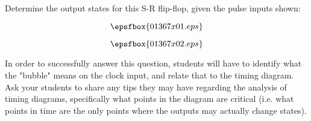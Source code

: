 

Determine the output states for this S-R flip-flop, given the pulse inputs shown:

$$\epsfbox{01367x01.eps}$$







$$\epsfbox{01367x02.eps}$$







In order to successfully answer this question, students will have to identify what the "bubble" means on the clock input, and relate that to the timing diagram.  Ask your students to share any tips they may have regarding the analysis of timing diagrams, specifically what points in the diagram are critical (i.e. what points in time are the only points where the outputs may actually change states).




